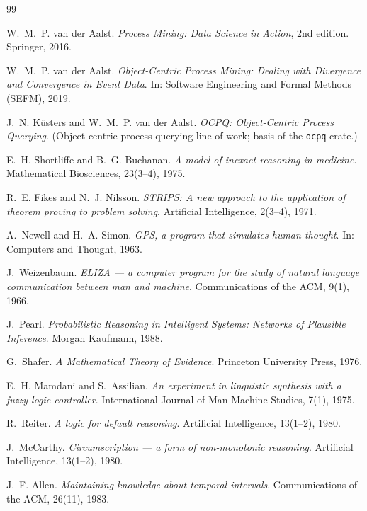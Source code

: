 \documentclass[11pt,oneside]{report}
\begin{document}
\begin{thebibliography}{99}

 W.~M.~P. van der Aalst.
\emph{Process Mining: Data Science in Action}, 2nd edition. Springer, 2016.

 W.~M.~P. van der Aalst.
\emph{Object-Centric Process Mining: Dealing with Divergence and
Convergence in Event Data}. In: Software Engineering and Formal Methods
(SEFM), 2019.

 J.~N. K\"usters and W.~M.~P. van der Aalst.
\emph{OCPQ: Object-Centric Process Querying}. (Object-centric process
querying line of work; basis of the \texttt{ocpq} crate.)

 E.~H. Shortliffe and B.~G. Buchanan.
\emph{A model of inexact reasoning in medicine}. Mathematical Biosciences,
23(3--4), 1975.

 R.~E. Fikes and N.~J. Nilsson.
\emph{STRIPS: A new approach to the application of theorem proving to
problem solving}. Artificial Intelligence, 2(3--4), 1971.

 A.~Newell and H.~A. Simon.
\emph{GPS, a program that simulates human thought}. In: Computers and
Thought, 1963.

 J.~Weizenbaum.
\emph{ELIZA --- a computer program for the study of natural language
communication between man and machine}. Communications of the ACM, 9(1),
1966.

 J.~Pearl.
\emph{Probabilistic Reasoning in Intelligent Systems: Networks of
Plausible Inference}. Morgan Kaufmann, 1988.

 G.~Shafer.
\emph{A Mathematical Theory of Evidence}. Princeton University Press, 1976.

 E.~H. Mamdani and S.~Assilian.
\emph{An experiment in linguistic synthesis with a fuzzy logic controller}.
International Journal of Man-Machine Studies, 7(1), 1975.

 R.~Reiter.
\emph{A logic for default reasoning}. Artificial Intelligence, 13(1--2),
1980.

 J.~McCarthy.
\emph{Circumscription --- a form of non-monotonic reasoning}. Artificial
Intelligence, 13(1--2), 1980.

 J.~F. Allen.
\emph{Maintaining knowledge about temporal intervals}. Communications of
the ACM, 26(11), 1983.


\end{thebibliography}
\end{document}
